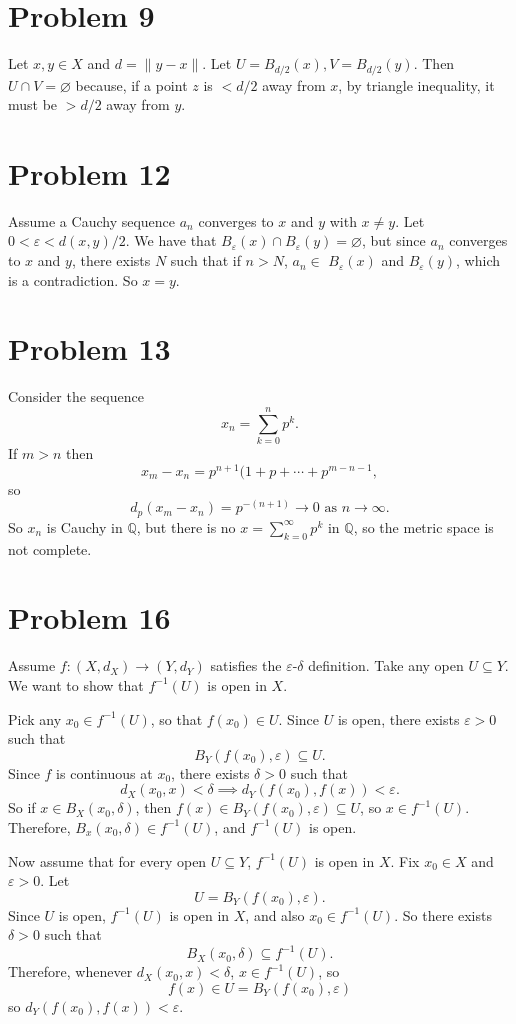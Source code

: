 \documentclass{article}
\newcommand{\Q}{\mathbb{Q}}
\newcommand{\eps}{\varepsilon}
\renewcommand{\emptyset}{\varnothing}
\begin{document}
\section*{Problem 9}
Let $x, y \in X$ and $d = \|y - x\|$. Let $U = B_{d/2}(x), V = B_{d/2}(y)$. Then $U \cap V = \emptyset$ because, if a point $z$ is $< d/2$ away from $x$, by triangle inequality, it must be $> d/2$ away from $y$.

\section*{Problem 12}
Assume a Cauchy sequence $a_n$ converges to $x$ and $y$ with $x \neq y$. Let $0 < \eps < d(x, y) / 2$. We have that $B_\eps(x) \cap B_\eps(y) = \emptyset$, but since $a_n$ converges to $x$ and $y$, there exists $N$ such that if $n > N$, $a_n \in$ $B_\eps(x)$ and $B_\eps(y)$, which is a contradiction. So $x = y$.

\section*{Problem 13}
Consider the sequence
$$x_n = \sum_{k = 0}^n p^k.$$
If $m > n$ then
$$x_m - x_n = p^{n + 1}(1 + p + \cdots + p^{m - n - 1},$$
so
$$d_p(x_m - x_n) = p^{-(n + 1)} \to 0 \text{ as } n \to \infty.$$
So $x_n$ is Cauchy in $\Q$, but there is no $x = \sum_{k = 0}^\infty p^k$ in $\Q$, so the metric space is not complete.

\section*{Problem 16}
Assume $f: (X, d_X) \to (Y, d_Y)$ satisfies the $\eps$-$\delta$ definition. Take any open $U \subseteq Y$. We want to show that $f^{-1}(U)$ is open in $X$.

Pick any $x_0 \in f^{-1}(U)$, so that $f(x_0) \in U$. Since $U$ is open, there exists $\eps > 0$ such that
$$B_Y(f(x_0), \eps) \subseteq U.$$
Since $f$ is continuous at $x_0$, there exists $\delta > 0$ such that
$$d_X(x_0, x) < \delta \implies d_Y(f(x_0), f(x)) < \eps.$$
So if $x \in B_X(x_0, \delta)$, then $f(x) \in B_Y(f(x_0), \eps) \subseteq U$, so $x \in f^{-1}(U)$. Therefore, $B_x(x_0, \delta) \in f^{-1}(U)$, and $f^{-1}(U)$ is open.

Now assume that for every open $U \subseteq Y$, $f^{-1}(U)$ is open in $X$. Fix $x_0 \in X$ and $\eps > 0$. Let
$$U = B_Y(f(x_0), \eps).$$
Since $U$ is open, $f^{-1}(U)$ is open in $X$, and also $x_0 \in f^{-1}(U)$. So there exists $\delta > 0$ such that
$$B_X(x_0, \delta) \subseteq f^{-1}(U).$$
Therefore, whenever $d_X(x_0, x) < \delta$, $x \in f^{-1}(U)$, so
$$f(x) \in U = B_Y(f(x_0), \eps)$$
so $d_Y(f(x_0), f(x)) < \eps$.
\end{document}
